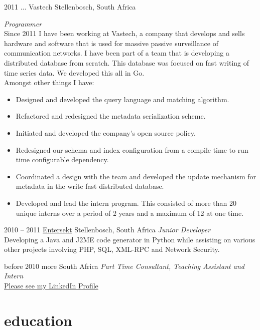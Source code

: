\documentclass[]{friggeri-cv} %
\begin{document}
\begin{entrylist}

\entry
{2011 ...}
{Vastech}
{Stellenbosch, South Africa}
{\emph{Programmer} \\
Since 2011 I have been working at Vastech, a company that develops and sells hardware and software that is used for massive passive surveillance of communication networks. I have been part of a team that is developing a distributed database from scratch. This database was focused on fast writing of time series data.  We developed this all in Go. \\
Amongst other things I have: \\
\begin{itemize}
\item Designed and developed the query language and matching algorithm.
\item Refactored and redesigned the metadata serialization scheme.
\item Initiated and developed the company's open source policy.
\item Redesigned our schema and index configuration from a compile time to run time configurable dependency.
\item Coordinated a design with the team and developed the update mechanism for metadata in the write fast distributed database.
\item Developed and lead the intern program. This consisted of more than 20 unique interns over a period of 2 years and a maximum of 12 at one time.
\end{itemize}
}

\entry
{2010 -- 2011}
{\href{https://www.entersekt.com/}{Entersekt}}
{Stellenbosch, South Africa}
{\emph{Junior Developer} \\
Developing a Java and J2ME code generator in Python while assisting on various other projects involving PHP, SQL, XML-RPC and Network Security.}

\entry
{before 2010}
{more}
{South Africa}
{\emph{Part Time Consultant, Teaching Assistant and Intern} \\
\href{https://za.linkedin.com/in/schulzewalter}{Please see my LinkedIn Profile}
}

\end{entrylist}

\section{education}
\end{document}
